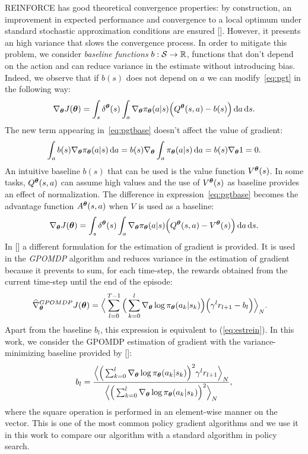 \newline
REINFORCE has good theoretical convergence properties: by construction, an improvement in expected performance and convergence to a local optimum under standard stochastic approximation conditions are ensured [\cite{sutton2018reinforcement}]. However, it presents an high variance that slows the convergence process. In order to mitigate this problem, we consider \emph{baseline functions} $b: \mathcal{S} \to \mathbb{R}$, \ie functions that don't depend on the action and can reduce variance in the estimate without introducing bias.
Indeed, we observe that if $b(s)$ does not depend on $a$ we can modify~\eqref{eq:pgt} in the following way:
\begin{align} \nabla_{\boldsymbol{\theta}}J(\boldsymbol{\theta}) = \int_s \delta^{\boldsymbol{\theta}}(s) \int_a \nabla_{\boldsymbol{\theta}} \pi_{\boldsymbol{\theta}}(a|s) \Big( Q^{\boldsymbol{\theta}}(s,a) -b(s) \Big) \,\mathrm{d} a \,\mathrm{d} s. \label{eq:pgtbase}\end{align}
The new term appearing in~\eqref{eq:pgtbase} doesn't affect the value of gradient:
\begin{align} \int_a b(s) \nabla_{\boldsymbol{\theta}} \pi_{\boldsymbol{\theta}}(a|s) \,\mathrm{d} a = b(s) \nabla_{\boldsymbol{\theta}} \int_a \pi_{\boldsymbol{\theta}}(a|s) \,\mathrm{d} a = b(s) \nabla_{\boldsymbol{\theta}} 1 = 0. \end{align}
An intuitive baseline $b(s)$ that can be used is the value function $V^{\boldsymbol{\theta}}(s)$. In some tasks, $Q^{\boldsymbol{\theta}}(s,a)$ can assume high values and the use of $V^{\boldsymbol{\theta}}(s)$ as baseline provides an effect of normalization. The difference in expression~\eqref{eq:pgtbase} becomes the advantage function $A^{\boldsymbol{\theta}}(s,a)$ when $V$ is used as a baseline:
\begin{align} \nabla_{\boldsymbol{\theta}}J(\boldsymbol{\theta}) = \int_s \delta^{\boldsymbol{\theta}}(s) \int_a \nabla_{\boldsymbol{\theta}} \pi_{\boldsymbol{\theta}}(a|s) \Big( Q^{\boldsymbol{\theta}}(s,a) - V^{\boldsymbol{\theta}}(s) \Big) \,\mathrm{d} a \,\mathrm{d} s.\end{align}
In [\cite{Peters2008ReinforcementLO}] a different formulation for the estimation of gradient is provided. It is used in the \emph{GPOMDP} algorithm and reduces variance in the estimation of gradient because it prevents to sum, for each time-step, the rewards obtained from the current time-step until the end of the episode:
\begin{align}
\widehat{\nabla}_{\boldsymbol{\theta}}^{GPOMDP}J(\boldsymbol{\theta}) &= \Big\langle \sum_{l=0}^{T-1} \Big( \sum_{k=0}^{l} \nabla_{\boldsymbol{\theta}}\log\pi_{\boldsymbol{\theta}}(a_k|s_k)\Big)\Big(\gamma^{l}r_{l+1} - b_{l} \Big)  \Big\rangle_{N}.
\end{align}
Apart from the baseline $b_l$, this expression is equivalent to (\ref{eq:estrein}). In this work, we consider the GPOMDP estimation of gradient with the variance-minimizing baseline provided by [\cite{Peters2008ReinforcementLO}]:
\begin{align} b_l = \frac{\Big\langle\Big( \sum_{k=0}^{l}\nabla_{\boldsymbol{\theta}} \log\pi_{\boldsymbol{\theta}}(a_k|s_k)\Big)^2 \gamma^{l}r_{l+1}\Big\rangle_{N}} {\Big\langle\Big( \sum_{k=0}^{l}\nabla_{\boldsymbol{\theta}} \log\pi_{\boldsymbol{\theta}}(a_k|s_k)\Big)^2\Big\rangle_{N}},
\end{align}
where the square operation is performed in an element-wise manner on the vector.
This is one of the most common policy gradient algorithms and we use it in this work to compare our algorithm with a standard algorithm in policy search.


